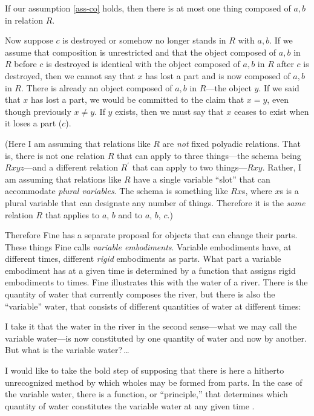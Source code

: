 \documentclass[12pt,twoside]{reedfancy}
\newenvironment{squote}{%
	\begin{spacing}{1}
	\begin{list}{}{%
	\setlength{\labelwidth}{0pt}%
	\rightmargin\leftmargin%
	}
	\item\relax
	}{%
	\end{list}%
	\end{spacing}
	}
\begin{document}
\begin{spacing}{1.25}
If our assumption \ref{ass-co} holds, then there is at most one thing
composed of $a, b$ in relation $R$.

Now suppose $c$ is destroyed or somehow no longer stands in $R$ with
$a, b$.  If we assume that composition is unrestricted and that the
object composed of $a, b$ in $R$ before $c$ is destroyed is identical
with the object composed of $a, b$ in $R$ after $c$ is destroyed, then
we cannot say that $x$ has lost a part and is now composed of $a, b$
in $R$.  There is already an object composed of $a, b$ in $R$---the
object $y$.  If we said that $x$ has lost a part, we would be
committed to the claim that $x = y$, even though previously $x \neq
y$.  If $y$ exists, then we must say that $x$ ceases to exist when it
loses a part ($c$).

(Here I am assuming that relations like $R$ are {\em not} fixed
polyadic relations.  That is, there is not one relation $R$ that can
apply to three things---the schema being $Rxyz$---and a different
relation $R^{\prime}$ that can apply to two things---$Rxy$.  Rather, I
am assuming that relations like $R$ have a single variable ``slot''
that can accommodate {\em plural variables}.  The schema is something
like $Rx$s, where $x$s is a plural variable that can designate any
number of things.  Therefore it is the {\em same} relation $R$ that
applies to $a$, $b$ and to $a$, $b$, $c$.)

Therefore Fine has a separate proposal for objects that can change
their parts.  These things Fine calls {\em variable embodiments}.
Variable embodiments have, at different times, different {\em rigid}
embodiments as parts.  What part a variable embodiment has at a given
time is determined by a function that assigns rigid embodiments to
times.  Fine illustrates this with the water of a river.  There is the
quantity of water that currently composes the river, but there is also
the ``variable'' water, that consists of different quantities of water
at different times:

\begin{squote}
I take it that the water in the river in the second sense---what we may
call the variable water---is now constituted by one quantity of water
and now by another. But what is the variable water?\,\ldots

I would like to take the bold step of supposing that there is here a
hitherto unrecognized method by which wholes may be formed from parts.
In the case of the variable water, there is a function, or
``principle,'' that determines which quantity of water constitutes the
variable water at any given time \citeyearpar[68]{fine1999}.
\end{squote}


\end{spacing}
\end{document}
